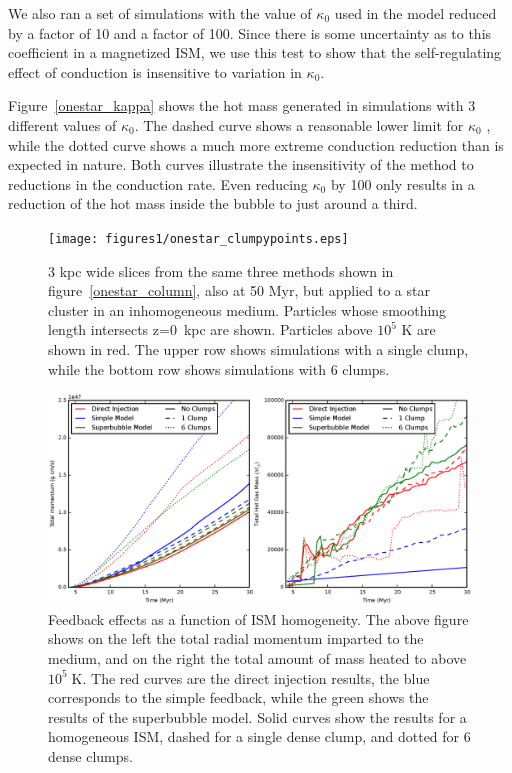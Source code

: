 We also ran a set of simulations with the value of $\kappa_0$ used in the model
reduced by a factor of 10 and a factor of 100.  Since there is some uncertainty
as to this coefficient in a magnetized ISM, we use this test to show that the
self-regulating effect of conduction is insensitive to variation in $\kappa_0$.

Figure~\ref{onestar_kappa} shows the hot mass generated in simulations with 3
different values of $\kappa_0$.  The dashed curve shows a reasonable lower limit
for $\kappa_0$ \citep{Cowie1977}, while the dotted curve shows a much more
extreme conduction reduction than is expected in nature.  Both curves illustrate
the insensitivity of the method to reductions in the conduction rate.  Even
reducing $\kappa_0$ by 100 only results in a reduction of the hot mass inside
the bubble to just around a third.  


\begin{figure}
    \texttt{[image: figures1/onestar\_clumpypoints.eps]}
    \caption[Image of superbubbles in a clumpy ISM]{3 kpc wide slices
    from the same three methods shown in figure~\ref{onestar_column}, also at 50
    Myr, but applied to a star cluster in an inhomogeneous medium.  Particles
    whose smoothing length intersects z=0~kpc are shown.  Particles above $10^5$
    K are shown in red.  The upper row shows simulations with a single clump,
    while the bottom row shows simulations with 6 clumps.}
    \label{onestar_clumpyslice}
\end{figure}

\begin{figure}
    \includegraphics[width=\textwidth]{figures1/onestar_clumpy.eps}
    \caption[Feedback effects as a function of ISM homogeneity]{Feedback effects
    as a function of ISM homogeneity.  The above figure shows on the left the
    total radial momentum imparted to the medium, and on the right the total
    amount of mass heated to above $10^5\;\mathrm{K}$.  The red curves are the
    direct injection results, the blue corresponds to the simple feedback, while
    the green shows the results of the superbubble model.  Solid curves show the
    results for a homogeneous ISM, dashed for a single dense clump, and dotted
    for 6 dense clumps.}
    \label{onestar_clumpy}
\end{figure}

